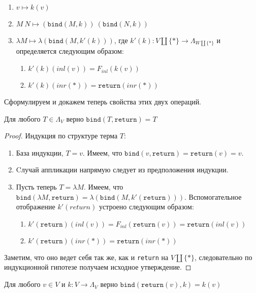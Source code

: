 \begin{enumerate}
  \item $v \mapsto k(v)$
  \item $M\ N \mapsto (\texttt{bind}(M, k))\ (\texttt{bind}(N, k))$
  \item $\lambda M \mapsto \lambda(\texttt{bind}(M, k'(k)))$, где $k'(k) : V \coprod \{*\} \to \Lambda_{W \coprod \{*\}}$ и определяется следующим образом:
    \begin{enumerate}
      \item $k'(k)(inl(v)) = F_{inl}(k(v))$
      \item $k'(k)(inr(*)) = \texttt{return}(inr(*))$
    \end{enumerate}
\end{enumerate}


Сформулируем и докажем теперь свойства этих двух операций.

\begin{prop}
  Для любого $T \in \Lambda_{V}$ верно $\texttt{bind}(T, \texttt{return}) = T$
\end{prop}

\begin{proof}
  Индукция по структуре терма $T$:
  \begin{enumerate}
    \item База индукции, $T = v$. Имеем, что $\texttt{bind}(v, \texttt{return}) = \texttt{return}(v) = v$.
    \item Cлучай аппликации напрямую следует из предположения индукции.
    \item Пусть теперь $T = \lambda M$. Имеем, что $\texttt{bind}(\lambda M, \texttt{return}) = \lambda (\texttt{bind}(M, k'(\texttt{return})))$. Вспомогательное отображение $k'(return)$ устроено следующим образом:
    \begin{enumerate}
      \item $k'(\texttt{return})(inl(v)) = F_{inl}(\texttt{return}(v)) = \texttt{return}(inl(v))$
      \item $k'(\texttt{return})(inr(*)) = \texttt{return}(inr(*))$
    \end{enumerate}
  \end{enumerate}

  Заметим, что оно ведет себя так же, как и \texttt{return} на $V \coprod \{*\}$, следовательно по индукционной гипотезе получаем исходное утверждение.
\end{proof}

\begin{prop}
  Для любого $v \in V$ и $k : V \to \Lambda_{V}$ верно $\texttt{bind}(\texttt{return}(v), k) = k(v)$
\end{prop}

